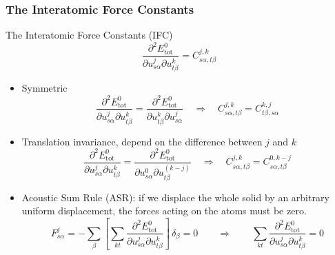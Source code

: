 \begin{frame}
  \frametitle{The Interatomic Force Constants}
  The Interatomic Force Constants (IFC)
  \begin{equation*}
    \frac{
      \partial^2 E^0_{\text{tot}}
    }{
      \partial {u}_{s\alpha}^j
      \partial {u}_{t\beta}^k
    }
    =
    C_{s\alpha, t\beta}^{j, k}
  \end{equation*}

  \begin{itemize}
  \item Symmetric
    \begin{equation}
      \label{eq:ifc_sym_prop}
        \frac{
        \partial^2 E^0_{\text{tot}}
        }{
        \partial {u}_{s\alpha}^j
        \partial {u}_{t\beta}^k
        }
        =
        \frac{
        \partial^2 E^0_{\text{tot}}
        }{
        \partial {u}_{t\beta}^k
        \partial {u}_{s\alpha}^j
        }
        \quad \Rightarrow \quad
        C_{s\alpha, t\beta}^{j, k}
        =
        C_{t\beta, s\alpha}^{k, j}
    \end{equation}
  \item Translation invariance, depend on the difference between $j$ and $k$
    \begin{equation}
      \label{eq:ifc_ti_prop}
        \frac{
        \partial^2 E^0_{\text{tot}}
        }{
        \partial {u}_{s\alpha}^j
        \partial {u}_{t\beta}^k
        }
        =
        \frac{
        \partial^2 E^0_{\text{tot}}
        }{
        \partial {u}_{s\alpha}^0
        \partial {u}_{t\beta}^{(k-j)}
        }
        \quad \Rightarrow \quad
        C_{s\alpha, t\beta}^{j, k}
        =
        C_{s\alpha, t\beta}^{0, k-j}
    \end{equation}
  \item Acoustic Sum Rule (ASR): if we displace the whole solid by an arbitrary uniform
    displacement, the forces acting on the atoms must be zero.
    \begin{equation}
      \label{eq:ifc_asr_prop}
      F_{s\alpha}^j =
      - \sum_{\beta}
      \left[
        \sum_{kt}
        \frac{
        \partial^2 E^0_{\text{tot}}
        }{
        \partial {u}_{s\alpha}^j
        \partial {u}_{t\beta}^k
        }
      \right]
      \,
      \delta_\beta
      = 0
      \qquad\Rightarrow\qquad
      \sum_{kt}
        \frac{
        \partial^2 E^0_{\text{tot}}
        }{
        \partial {u}_{s\alpha}^j
        \partial {u}_{t\beta}^k
        } = 0
      \end{equation}
  \end{itemize}
\end{frame}
